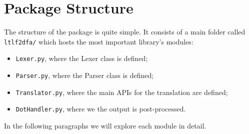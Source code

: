 \section{Package Structure}
The structure of the \LTLfToDFA package is quite simple. It consists of a main folder called \texttt{ltlf2dfa/} which hosts the most important library's modules:
\begin{itemize}
\item \texttt{Lexer.py}, where the Lexer class is defined;
\item \texttt{Parser.py}, where the Parser class is defined;
\item \texttt{Translator.py}, where the main APIs for the translation are defined;
\item \texttt{DotHandler.py}, where we the \MONA output is post-processed.
\end{itemize}
In the following paragraphs we will explore each module in detail.
